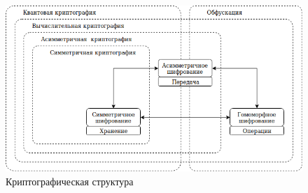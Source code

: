 \begin{figure}[ht]
  \centering
  \includegraphics[scale=0.7]{share/struct.png}
  \caption{Криптографическая структура}
  \label{fig:struct}
\end{figure}
